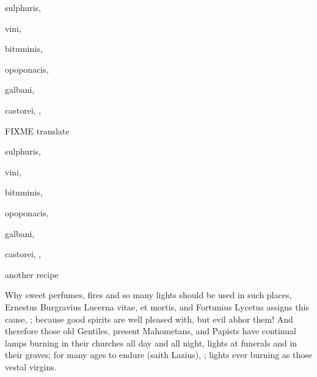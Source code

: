 {\begin{Prescription}[H]
{\centering%
\begin{minipage}[c]{0.4\textwidth}%
\begin{latin}%
\begin{prescriptionbox}{}{}
\item sulphuris,
\item vini,
\item bituminis,
\item opoponacis,
\item galbani,
\item castorei, \etc{},
\end{prescriptionbox}%
\end{latin}%
\end{minipage}%
\begin{minipage}[c]{0.4\textwidth}
\begin{latin}
\begin{prescriptionbox}{FIXME translate}{}
\item sulphuris,
\item vini,
\item bituminis,
\item opoponacis,
\item galbani,
\item castorei, \etc{},
\end{prescriptionbox}%
\end{latin}%
\end{minipage}\par
}%
\caption{another recipe}
\end{Prescription}

Why sweet perfumes, fires and so many lights
should be used in such places, Ernestus Burgravius Lucerna \textlatin{vitae, et
mortis}, and Fortunius Lycetus assigns this cause, ; because good spirits are well pleased
with, but evil abhor them! And therefore those old Gentiles, present
Mahometans, and Papists have continual lamps burning in their churches
all day and all night, lights at funerals and in their graves;  for many ages to endure (saith Lazius), ; lights ever burning as those vestal virgins.

}
